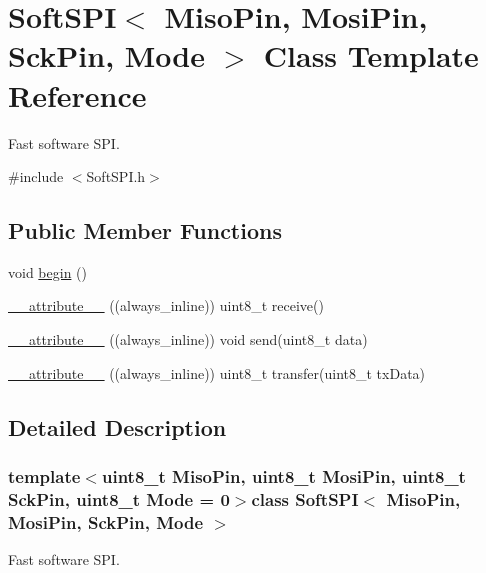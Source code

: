 \hypertarget{class_soft_s_p_i}{\section{Soft\-S\-P\-I$<$ Miso\-Pin, Mosi\-Pin, Sck\-Pin, Mode $>$ Class Template Reference}
\label{class_soft_s_p_i}
}


Fast software S\-P\-I.  




{\ttfamily \#include $<$Soft\-S\-P\-I.\-h$>$}

\subsection*{Public Member Functions}
\begin{DoxyCompactItemize}
\item 
void \hyperlink{class_soft_s_p_i_ab0bdf5cca484fb2ba637c39384b27fb2}{begin} ()
\item 
\hyperlink{class_soft_s_p_i_aefaf502baea70d3650ee7a96156ab56f}{\-\_\-\-\_\-attribute\-\_\-\-\_\-} ((always\-\_\-inline)) uint8\-\_\-t receive()
\item 
\hyperlink{class_soft_s_p_i_a03dd23c0ef3acd4fa3c584fffeefa90f}{\-\_\-\-\_\-attribute\-\_\-\-\_\-} ((always\-\_\-inline)) void send(uint8\-\_\-t data)
\item 
\hyperlink{class_soft_s_p_i_a1bc0f41f05726fc63c49d680e3021301}{\-\_\-\-\_\-attribute\-\_\-\-\_\-} ((always\-\_\-inline)) uint8\-\_\-t transfer(uint8\-\_\-t tx\-Data)
\end{DoxyCompactItemize}


\subsection{Detailed Description}
\subsubsection*{template$<$uint8\-\_\-t Miso\-Pin, uint8\-\_\-t Mosi\-Pin, uint8\-\_\-t Sck\-Pin, uint8\-\_\-t Mode = 0$>$class Soft\-S\-P\-I$<$ Miso\-Pin, Mosi\-Pin, Sck\-Pin, Mode $>$}

Fast software S\-P\-I. 

